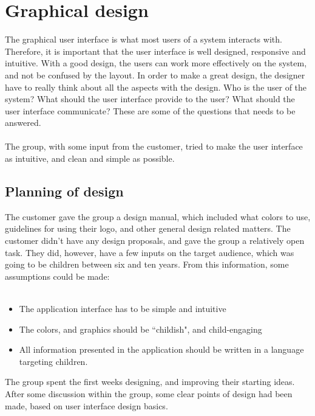 \chapter{Graphical design}
The graphical user interface is what most users of a system interacts with. Therefore, it is important that the user interface is well designed, responsive and intuitive. With a good design, the users can work more effectively on the system, and not be confused by the layout. In order to make a great design, the designer have to really think about all the aspects with the design. Who is the user of the system? What should the user interface provide to the user? What should the user interface communicate? These are some of the questions that needs to be answered.
\\\\
The group, with some input from the customer, tried to make the user interface as intuitive, and clean and simple as possible.

\section{Planning of design}
The customer gave the group a design manual, which included what colors to use, guidelines for using their logo, and other general design related matters. The customer didn't have any design proposals, and gave the group a relatively open task. They did, however, have a few inputs on the target audience, which was going to be children between six and ten years. From this information, some assumptions could be made:\\
\\

\begin{itemize}
  \item The application interface has to be simple and intuitive
  \item The colors, and graphics should be ``childish", and child-engaging
  \item All information presented in the application should be written in a language targeting children.
\end{itemize}

The group spent the first weeks designing, and improving their starting ideas. After some discussion within the group, some clear points of design had been made, based on user interface design basics. \cite{uidesignbasics}


